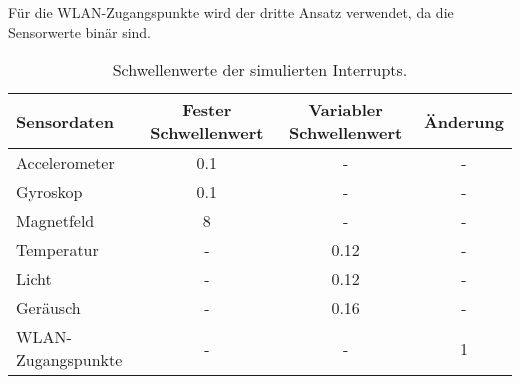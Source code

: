Für die WLAN-Zugangspunkte wird der dritte Ansatz verwendet, da die Sensorwerte binär sind.
\begin{table}[h!]
    \centering
    \begin{tabular}{ | l | c | c | c | }
        \hline
        Sensordaten & Fester Schwellenwert & Variabler Schwellenwert & Änderung \\\hline
        Accelerometer & 0.1 & - & - \\\hline
        Gyroskop & 0.1 & - & - \\\hline
        Magnetfeld & 8 & - & - \\\hline
        Temperatur & - & 0.12 & - \\\hline
        Licht & - & 0.12 & - \\\hline
        Geräusch & - & 0.16 & - \\\hline
        WLAN-Zugangspunkte & - & - & 1 \\\hline
    \end{tabular}
    \caption{Schwellenwerte der simulierten Interrupts.}
    \label{tab:interrupt_values}
\end{table}

